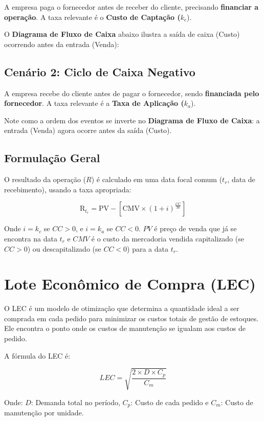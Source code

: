 \documentclass[
  a4paper,
]{book}
\begin{document}
A empresa paga o fornecedor antes de receber do cliente, precisando
\textbf{financiar a operação}. A taxa relevante é o \textbf{Custo de
Captação (}\(k_c\)).

O \textbf{Diagrama de Fluxo de Caixa} abaixo ilustra a saída de caixa
(Custo) ocorrendo antes da entrada (Venda):

\subsection{Cenário 2: Ciclo de Caixa
Negativo}\label{cenuxe1rio-2-ciclo-de-caixa-negativo}

A empresa recebe do cliente antes de pagar o fornecedor, sendo
\textbf{financiada pelo fornecedor}. A taxa relevante é a \textbf{Taxa
de Aplicação (}\(k_a\)).

Note como a ordem dos eventos se inverte no \textbf{Diagrama de Fluxo de
Caixa}: a entrada (Venda) agora ocorre antes da saída (Custo).

\subsection{Formulação Geral}\label{formulauxe7uxe3o-geral}

O resultado da operação (\(R\)) é calculado em uma data focal comum
(\(t_r\), data de recebimento), usando a taxa apropriada:

\[
\text{R}_{t_r} = \text{PV} - \left[ \text{CMV} \times (1 + i)^{\frac{CC}{30}} \right]
\]

Onde \(i = k_c\) se \(CC > 0\), e \(i = k_a\) se \(CC < 0\). \(PV\) é
preço de venda que já se encontra na data \(t_r\) e \(CMV\) é o custo da
mercadoria vendida capitalizado (se \(CC > 0\)) ou descapitalizado (se
\(CC < 0\)) para a data \(t_r\).

\section{Lote Econômico de Compra
(LEC)}\label{lote-econuxf4mico-de-compra-lec}

O LEC é um modelo de otimização que determina a quantidade ideal a ser
comprada em cada pedido para minimizar os custos totais de gestão de
estoques. Ele encontra o ponto onde os custos de manutenção se igualam
aos custos de pedido.

A fórmula do LEC é:

\[
LEC = \sqrt{\frac{2 \times D \times C_p}{C_m}}
\]

Onde: \(D\): Demanda total no período, \(C_p\): Custo de cada pedido e
\(C_m\): Custo de manutenção por unidade.
\end{document}
